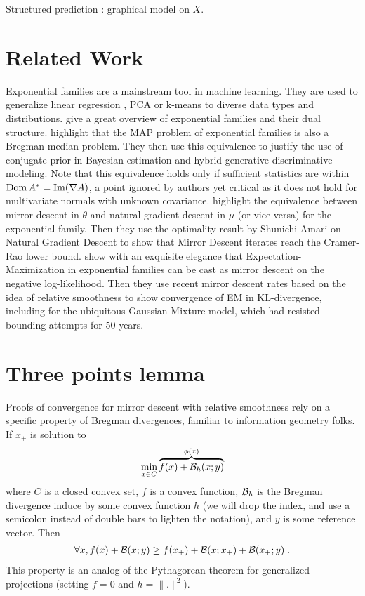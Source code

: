 \documentclass{article}
\newcommand{\logpart}{A}
\newcommand{\conj}{\logpart^*}
\newcommand{\natp}{\theta}
\newcommand{\meanp}{\mu}
\begin{document}
Structured prediction : graphical model on $X$.


\section{Related Work}
Exponential families are a mainstream tool in machine learning. They are used  to generalize linear regression \citep{mccullagh1989generalized}, PCA \citep{collins2001generalization} or k-means \citep{banerjee2005clustering} to diverse data types and distributions.
\citet[Chapter 3]{wainwright2008graphical} give a great overview of exponential families and their dual structure. 
\citet{agarwal2010geometric} highlight that the MAP problem of exponential families is also a Bregman median problem. They then use this equivalence to justify the use of conjugate prior in Bayesian estimation and hybrid generative-discriminative modeling.
Note that this equivalence holds only if sufficient statistics are within $\dom \conj  = \mathrm{Im} (\nabla\logpart)$, a point ignored by authors yet critical as it does not hold for multivariate normals with unknown covariance. 
\citet{raskutti2015information} highlight the equivalence between mirror descent in $\natp$ and natural gradient descent in $\meanp$ (or vice-versa) for the exponential family. Then they use the optimality result by Shunichi Amari on Natural Gradient Descent to show that Mirror Descent iterates reach the Cramer-Rao lower bound.
\citet{kunstner2020homeomorphic} show with an exquisite elegance that Expectation-Maximization in exponential families can be cast as mirror descent on the negative log-likelihood. Then they use recent mirror descent rates based on the idea of relative smoothness \citep{birnbaum2011distributed, bauschke2017descent, lu2018relatively} to show convergence of EM in KL-divergence, including for the ubiquitous Gaussian Mixture model, which had resisted bounding attempts for 50 years.







\newpage
\appendix

\section{Three points lemma}
\label{app:3points}

Proofs of convergence for mirror descent with relative smoothness rely on a specific property of Bregman divergences, familiar to information geometry folks. If $x_+$ is solution to 
\begin{align}
	\min	_{x\in C} \overbrace{f(x) + {\mathcal B}_h(x ; y)}^{\phi(x)}
\end{align}
where $C$ is a closed convex set, $f$ is a convex function, ${\mathcal B}_h$ is the Bregman divergence induce by some convex function $h$ (we will drop the index, and use a semicolon instead of double bars to lighten the notation), and $y$ is some reference vector. Then 
\begin{align}
	\forall x, f(x) + {\mathcal B}(x ;y) \geq f(x_+) + {\mathcal B}(x ; x_+) +{\mathcal B}(x_+ ; y) \; .
\end{align}
This property is an analog of the Pythagorean theorem for generalized projections (setting $f=0$ and $h=\|.\|^2$).
\end{document}
